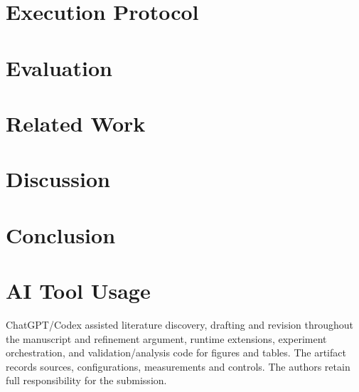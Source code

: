 \documentclass[conference,10pt]{IEEEtran}
\begin{document}
\section{Execution Protocol}\label{sec:protocol}


\section{Evaluation}\label{sec:eval}






\section{Related Work}\label{sec:related}

\section{Discussion}\label{sec:discussion}

\section{Conclusion}\label{sec:conclusion}

\section*{AI Tool Usage}
ChatGPT/Codex assisted literature discovery, drafting and revision
throughout the manuscript and refinement argument, runtime extensions,
experiment orchestration, and validation/analysis code for figures and
tables. The artifact records sources, configurations, measurements and
controls. The authors retain full responsibility for the submission.
\clearpage


\end{document}
